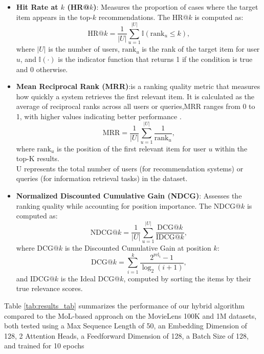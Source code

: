 \begin{itemize}
	\item \textbf{Hit Rate at \( k \) (HR@\( k \))}: Measures the proportion of cases where the target item appears in the top-\( k \) recommendations. The HR@\( k \) is computed as:\cite{Tamm_2021}
	\begin{equation}
		\text{HR@}k = \frac{1}{|U|} \sum_{u=1}^{|U|} \mathbb{I}(\text{rank}_u \leq k),
	\end{equation}
	where \( |U| \) is the number of users, \( \text{rank}_u \) is the rank of the target item for user \( u \), and \( \mathbb{I}(\cdot) \) is the indicator function that returns 1 if the condition is true and 0 otherwise.
	
	\item \textbf{Mean Reciprocal Rank (MRR)}:is a ranking quality metric that measures how quickly a system retrieves the first relevant item. It is calculated as the average of reciprocal ranks across all users or queries,MRR ranges from 0 to 1, with higher values indicating better performance \cite{eviden2025mrr}.
	\begin{equation}
		\text{MRR} = \frac{1}{|U|} \sum_{u=1}^{|U|} \frac{1}{\text{rank}_u},
	\end{equation}
	where \( \text{rank}_u \) is the position of the first relevant item for user \( u \) within the top-K results. \\ 
	U represents the total number of users (for recommendation systems) or queries (for information retrieval tasks) in the dataset.
	
	\item \textbf{Normalized Discounted Cumulative Gain (NDCG)}: Assesses the ranking quality while accounting for position importance. The NDCG@\( k \) is computed as:\cite{Tamm_2021}
	\begin{equation}
		\text{NDCG@}k = \frac{1}{|U|} \sum_{u=1}^{|U|} \frac{\text{DCG@}k}{\text{IDCG@}k},
	\end{equation}
	where \( \text{DCG@}k \) is the Discounted Cumulative Gain at position \( k \):
	\begin{equation}
		\text{DCG@}k = \sum_{i=1}^{k} \frac{2^{\text{rel}_i} - 1}{\log_2(i + 1)},
	\end{equation}
	and \( \text{IDCG@}k \) is the Ideal DCG@\( k \), computed by sorting the items by their true relevance scores.
\end{itemize}  
Table \ref{tab:results_tab} summarizes the performance of our hybrid algorithm compared to the MoL-based approach on the MovieLens 100K and 1M datasets, both tested using a Max Sequence Length of 50, an Embedding Dimension of 128, 2 Attention Heads, a Feedforward Dimension of 128, a Batch Size of 128, and trained for 10 epochs 
